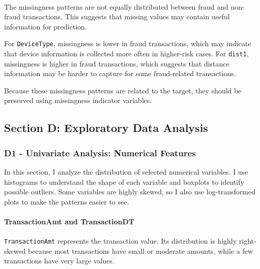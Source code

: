 \documentclass[11pt]{article}
\begin{document}
    \begin{center}
    \end{center}
    { \hspace*{\fill} \\}
    
    The missingness patterns are not equally distributed between fraud and
non-fraud transactions. This suggests that missing values may contain
useful information for prediction.

For \texttt{DeviceType}, missingness is lower in fraud transactions,
which may indicate that device information is collected more often in
higher-risk cases. For \texttt{dist1}, missingness is higher in fraud
transactions, which suggests that distance information may be harder to
capture for some fraud-related transactions.

Because these missingness patterns are related to the target, they
should be preserved using missingness indicator variables.

    \subsection{Section D: Exploratory Data
Analysis}\label{section-d-exploratory-data-analysis}

    \subsubsection{D1 - Univariate Analysis: Numerical
Features}\label{d1---univariate-analysis-numerical-features}

    In this section, I analyze the distribution of selected numerical
variables. I use histograms to understand the shape of each variable and
boxplots to identify possible outliers. Some variables are highly
skewed, so I also use log-transformed plots to make the patterns easier
to see.

    \paragraph{TransactionAmt and
TransactionDT}\label{transactionamt-and-transactiondt}

    \texttt{TransactionAmt} represents the transaction value. Its
distribution is highly right-skewed because most transactions have small
or moderate amounts, while a few transactions have very large values.
\end{document}
